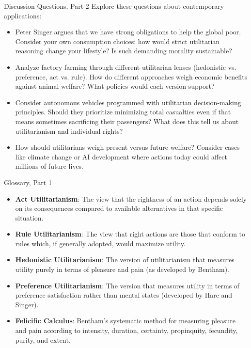 \documentclass[aspectratio=169]{beamer}
\begin{document}
\begin{frame}{Discussion Questions, Part 2}
    Explore these questions about contemporary applications:
    \begin{itemize}
        \item Peter Singer argues that we have strong obligations to help the global poor. Consider your own consumption choices: how would strict utilitarian reasoning change your lifestyle? Is such demanding morality sustainable?
        
        \item Analyze factory farming through different utilitarian lenses (hedonistic vs. preference, act vs. rule). How do different approaches weigh economic benefits against animal welfare? What policies would each version support?
        
        \item Consider autonomous vehicles programmed with utilitarian decision-making principles. Should they prioritize minimizing total casualties even if that means sometimes sacrificing their passengers? What does this tell us about utilitarianism and individual rights?
        
        \item How should utilitarians weigh present versus future welfare? Consider cases like climate change or AI development where actions today could affect millions of future lives.
    \end{itemize}
\end{frame}

\begin{frame}{Glossary, Part 1}
    \begin{itemize}
        \item \textbf{Act Utilitarianism}: The view that the rightness of an action depends solely on its consequences compared to available alternatives in that specific situation.
        
        \item \textbf{Rule Utilitarianism}: The view that right actions are those that conform to rules which, if generally adopted, would maximize utility.
        
        \item \textbf{Hedonistic Utilitarianism}: The version of utilitarianism that measures utility purely in terms of pleasure and pain (as developed by Bentham).
        
        \item \textbf{Preference Utilitarianism}: The version that measures utility in terms of preference satisfaction rather than mental states (developed by Hare and Singer).
        
        \item \textbf{Felicific Calculus}: Bentham's systematic method for measuring pleasure and pain according to intensity, duration, certainty, propinquity, fecundity, purity, and extent.
    \end{itemize}
\end{frame}
\end{document}

